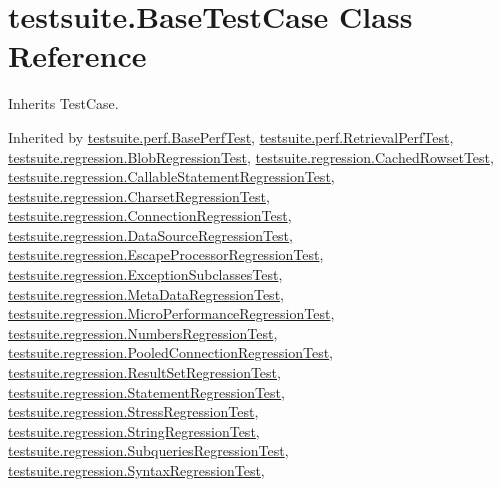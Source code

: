 \hypertarget{classtestsuite_1_1_base_test_case}{}\section{testsuite.\+Base\+Test\+Case Class Reference}
\label{classtestsuite_1_1_base_test_case}


Inherits Test\+Case.



Inherited by \mbox{\hyperlink{classtestsuite_1_1perf_1_1_base_perf_test}{testsuite.\+perf.\+Base\+Perf\+Test}}, \mbox{\hyperlink{classtestsuite_1_1perf_1_1_retrieval_perf_test}{testsuite.\+perf.\+Retrieval\+Perf\+Test}}, \mbox{\hyperlink{classtestsuite_1_1regression_1_1_blob_regression_test}{testsuite.\+regression.\+Blob\+Regression\+Test}}, \mbox{\hyperlink{classtestsuite_1_1regression_1_1_cached_rowset_test}{testsuite.\+regression.\+Cached\+Rowset\+Test}}, \mbox{\hyperlink{classtestsuite_1_1regression_1_1_callable_statement_regression_test}{testsuite.\+regression.\+Callable\+Statement\+Regression\+Test}}, \mbox{\hyperlink{classtestsuite_1_1regression_1_1_charset_regression_test}{testsuite.\+regression.\+Charset\+Regression\+Test}}, \mbox{\hyperlink{classtestsuite_1_1regression_1_1_connection_regression_test}{testsuite.\+regression.\+Connection\+Regression\+Test}}, \mbox{\hyperlink{classtestsuite_1_1regression_1_1_data_source_regression_test}{testsuite.\+regression.\+Data\+Source\+Regression\+Test}}, \mbox{\hyperlink{classtestsuite_1_1regression_1_1_escape_processor_regression_test}{testsuite.\+regression.\+Escape\+Processor\+Regression\+Test}}, \mbox{\hyperlink{classtestsuite_1_1regression_1_1_exception_subclasses_test}{testsuite.\+regression.\+Exception\+Subclasses\+Test}}, \mbox{\hyperlink{classtestsuite_1_1regression_1_1_meta_data_regression_test}{testsuite.\+regression.\+Meta\+Data\+Regression\+Test}}, \mbox{\hyperlink{classtestsuite_1_1regression_1_1_micro_performance_regression_test}{testsuite.\+regression.\+Micro\+Performance\+Regression\+Test}}, \mbox{\hyperlink{classtestsuite_1_1regression_1_1_numbers_regression_test}{testsuite.\+regression.\+Numbers\+Regression\+Test}}, \mbox{\hyperlink{classtestsuite_1_1regression_1_1_pooled_connection_regression_test}{testsuite.\+regression.\+Pooled\+Connection\+Regression\+Test}}, \mbox{\hyperlink{classtestsuite_1_1regression_1_1_result_set_regression_test}{testsuite.\+regression.\+Result\+Set\+Regression\+Test}}, \mbox{\hyperlink{classtestsuite_1_1regression_1_1_statement_regression_test}{testsuite.\+regression.\+Statement\+Regression\+Test}}, \mbox{\hyperlink{classtestsuite_1_1regression_1_1_stress_regression_test}{testsuite.\+regression.\+Stress\+Regression\+Test}}, \mbox{\hyperlink{classtestsuite_1_1regression_1_1_string_regression_test}{testsuite.\+regression.\+String\+Regression\+Test}}, \mbox{\hyperlink{classtestsuite_1_1regression_1_1_subqueries_regression_test}{testsuite.\+regression.\+Subqueries\+Regression\+Test}}, \mbox{\hyperlink{classtestsuite_1_1regression_1_1_syntax_regression_test}{testsuite.\+regression.\+Syntax\+Regression\+Test}}, 
